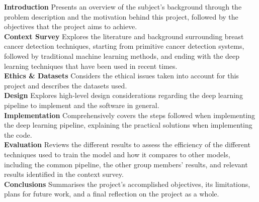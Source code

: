 \tab \textbf{Introduction} \space 
Presents an overview of the subject's background through the problem description and the motivation behind this project, followed by the objectives that the project aims to achieve.\\

\textbf{Context Survey} \space
Explores the literature and background surrounding breast cancer detection techniques, starting from primitive cancer detection systems, followed by traditional machine learning methods, and ending with the deep learning techniques that have been used in recent times.\\

\textbf{Ethics \& Datasets} \space
Considers the ethical issues taken into account for this project and describes the datasets used.\\

\textbf{Design} \space
Explores high-level design considerations regarding the deep learning pipeline to implement and the software in general.\\

\textbf{Implementation} \space
Comprehensively covers the steps followed when implementing the deep learning pipeline, explaining the practical solutions when implementing the code.\\ %

\textbf{Evaluation} \space
Reviews the different results to assess the efficiency of the different techniques used to train the model and how it compares to other models, including the common pipeline, the other group members' results, and relevant results identified in the context survey.\\

\textbf{Conclusions} \space
Summarises the project's accomplished objectives, its limitations, plans for future work, and a ﬁnal reflection on the project as a whole.
